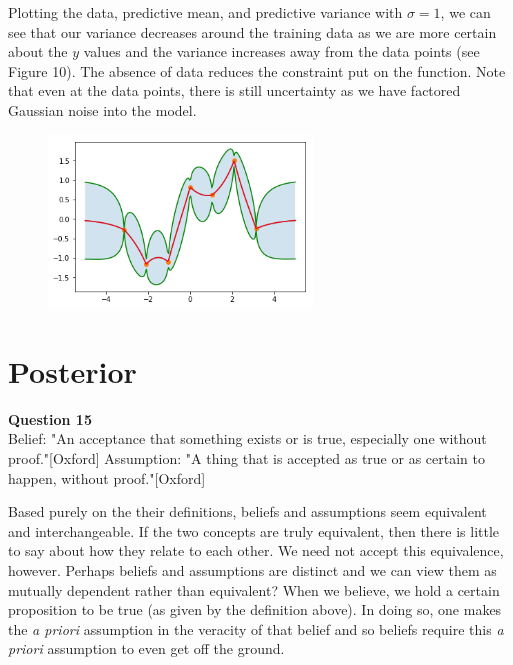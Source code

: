 \documentclass[10pt, a4paper, twocolumn]{article} %
\begin{document}
\begin{enumerate}
Plotting the data, predictive mean, and predictive variance with $\sigma = 1$, we can see that our variance decreases around the training data as we are more certain about the $y$ values and the variance increases away from the data points (see Figure 10). The absence of data reduces the constraint put on the function. Note that even at the data points, there is still uncertainty as we have factored Gaussian noise into the model.
 
 \begin{figure}[H]
      \centering
      \includegraphics[width=70mm, scale=0.5]{imagesfinal/Q14_predictive_variance.png}
      \label{fig:Q14_Predictive}
      \caption{}
  \end{figure}

\section{Posterior}

  \textbf{Question 15}\\
  Belief: "An acceptance that something exists or is true, especially one without proof."[Oxford]\newline
  Assumption: "A thing that is accepted as true or as certain to happen, without proof."[Oxford]\newline
  
  Based purely on the their definitions, beliefs and assumptions seem equivalent and interchangeable. If the two concepts are truly equivalent, then there is little to say about how they relate to each other. We need not accept this equivalence, however. Perhaps beliefs and assumptions are distinct and we can view them as mutually dependent rather than equivalent? When we believe, we hold a certain proposition to be true (as given by the definition above). In doing so, one makes the \textit{a priori} assumption in the veracity of that belief and so beliefs require this \textit {a priori} assumption to even get off the ground.
  

\end{enumerate}
\end{document}
